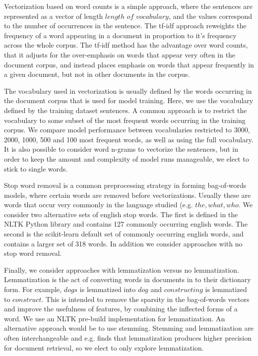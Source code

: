 \documentclass[conference]{IEEEtran}
\begin{document}
Vectorization based on word counts is a simple approach, where the sentences are represented as a vector of length $length$ $of$ $vocabulary$, and the values correspond to the number of occurrences in the sentence. The tf-idf approach reweights the frequency of a word appearing in a document in proportion to it's frequency across the whole corpus. The tf-idf method has the advantage over word counts, that it adjusts for the over-emphasis on words that appear very often in the document corpus, and instead places emphasis on words that appear frequently in a given document, but not in other documents in the corpus.

The vocabulary used in vectorization is usually defined by the words occurring in the document corpus that is used for model training. Here, we use the vocabulary defined by the training dataset sentences. A common approach is to  restrict the vocabulary to some subset of the most frequent words occurring in the training corpus. We compare model performance between vocabularies restricted to 3000, 2000, 1000, 500 and 100 most frequent words, as well as using the full vocabulary. It is also possible to consider word n-grams to vectorize the sentences, but in order to keep the amount and complexity of model runs manageable, we elect to stick to single words.

Stop word removal is a common preprocessing strategy in forming bag-of-words models, where certain words are removed before vectorizations. Usually these are words that occur very commonly in the language studied (e.g. $the, what, who$. We consider two alternative sets of english stop words. The first is defined in the NLTK \cite{nltk} Python library and contains 127 commonly occurring english words. The second is the scikit-learn \cite{scikit-learn} default set of commonly occurring english words, and contains a larger set of 318 words. In addition we consider approaches with no stop word removal. 

Finally, we consider approaches with lemmatization versus no lemmatization. Lemmatization is the act of converting words in documents in to their dictionary form. For example, $dogs$ is lemmatized into $dog$ and $constructing$ is lemmatized to $construct$. This is intended to remove the sparsity in the bag-of-words vectors and improve the usefulness of features, by combining the inflected forms of a word. We use an NLTK \cite{nltk} pre-build implementation for lemmatization. An alternative approach would be to use stemming. Stemming and lemmatization are often interchangeable and e.g. \cite{balakrishnan2014stemming} finds that lemmatization produces higher precision for document retrieval, so we elect to only explore lemmatization.
\end{document}
